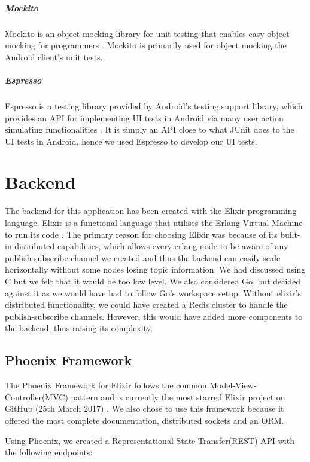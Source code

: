 \documentclass[11pt,a4paper]{report}
\begin{document}
\subparagraph{Mockito}
Mockito is an object mocking library for unit testing that enables easy object mocking for programmers \cite {website:mockito_homepage}. Mockito is primarily used for object mocking the Android client’s unit tests.
\subparagraph{Espresso}
Espresso is a testing library provided by Android’s testing support library, which provides an API for implementing UI tests in Android via many user action simulating functionalities \cite{website:espresso_homepage}. It is simply an API close to what JUnit does to the UI tests in Android, hence we used Espresso to develop our UI tests.

\section{Backend}

The backend for this application has been created with the Elixir programming language. Elixir is a functional language that utilises the Erlang Virtual Machine to run its code \cite{website:elixir_homepage}. The primary reason for choosing Elixir was because of its built-in distributed capabilities, which allows every erlang node to be aware of any publish-subscribe channel we created and thus the backend can easily scale horizontally without some nodes losing topic information. We had discussed using C but we felt that it would be too low level. We also considered Go, but decided against it as we would have had to follow Go's workspace setup.  Without elixir's distributed functionality, we could have created a Redis cluster to handle the publish-subscribe channels. However, this would have added more components to the backend, thus raising its complexity.

\subsection{Phoenix Framework}

The Phoenix Framework for Elixir follows the common Model-View-Controller(MVC) pattern and is currently the most starred Elixir project on GitHub (25th March 2017) \cite{website:github_elixir_trending}. We also chose to use this framework because it offered the most complete documentation, distributed sockets and an ORM.

Using Phoenix, we created a Representational State Transfer(REST) API with the following endpoints:
\end{document}
